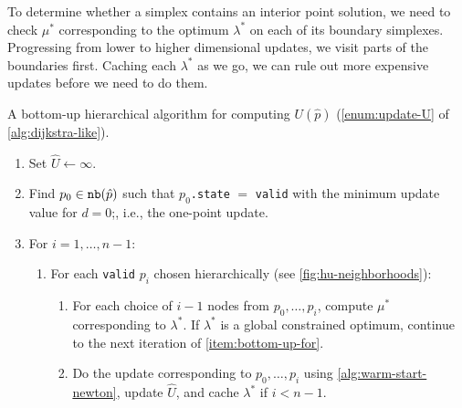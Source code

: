 \documentclass[eikonal.tex]{subfiles}
\begin{document}
To determine whether a simplex contains an interior point solution, we
need to check $\mu^*$ corresponding to the optimum $\lambda^*$ on each
of its boundary simplexes. Progressing from lower to higher
dimensional updates, we visit parts of the boundaries first. Caching
each $\lambda^*$ as we go, we can rule out more expensive updates
before we need to do them.

\begin{algorithm}[H]
  \caption{A bottom-up hierarchical algorithm for computing
    $U(\hat{p})$ (\cref{enum:update-U} of
    \cref{alg:dijkstra-like}).}\label{alg:bottom-up}
  \begin{enumerate}[nolistsep]
  \item Set $\hat{U} \gets \infty$.
  \item Find $p_0 \in \texttt{nb}(\hat{p})$ such that $p_0$\texttt{.state}
    $=$ \texttt{valid} with the minimum update value for $d = 0$;,
    i.e., the one-point update.
  \item For $i = 1, \hdots, n - 1$:
    \begin{enumerate}
    \item For each \texttt{valid} $p_i$ chosen hierarchically (see
      \cref{fig:hu-neighborhoods}):\label{item:bottom-up-for}
      \begin{enumerate}
      \item For each choice of $i - 1$ nodes from $p_0, \hdots, p_i$,
        compute $\mu^*$ corresponding to $\lambda^*$. If $\lambda^*$
        is a global constrained optimum, continue to the next
        iteration of \cref{item:bottom-up-for}.
      \item Do the update corresponding to $p_0, \hdots, p_{i}$ using
        \cref{alg:warm-start-newton}, update $\hat{U}$, and cache
        $\lambda^*$ if $i < n - 1$.
      \end{enumerate}
    \end{enumerate}
  \end{enumerate}
\end{algorithm}
\end{document}

